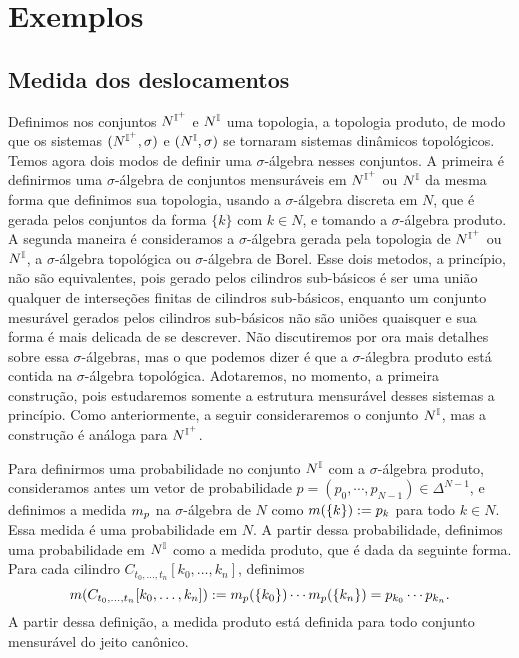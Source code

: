 










\section{Exemplos}

\subsection{Medida dos deslocamentos}

Definimos nos conjuntos $N^{\mathbb{I}^+}$ e $N^{\mathbb{I}}$ uma topologia, a topologia produto, de modo que os sistemas $(N^{\mathbb{I}^+},\sigma)$ e $(N^{\mathbb{I}},\sigma)$ se tornaram sistemas dinâmicos topológicos. Temos agora dois modos de definir uma $\sigma$-álgebra nesses conjuntos. A primeira é definirmos uma $\sigma$-álgebra de conjuntos mensuráveis em $N^{\mathbb{I}^+}$ ou $N^{\mathbb{I}}$ da mesma forma que definimos sua topologia, usando a $\sigma$-álgebra discreta em $N$, que é gerada pelos conjuntos da forma $\{k\}$ com $k \in N$, e tomando a $\sigma$-álgebra produto. A segunda maneira é consideramos a $\sigma$-álgebra gerada pela topologia de $N^{\mathbb{I}^+}$ ou $N^{\mathbb{I}}$, a $\sigma$-álgebra topológica ou $\sigma$-álgebra de Borel. Esse dois metodos, a princípio, não são equivalentes, pois gerado pelos cilindros sub-básicos é ser uma união qualquer de interseções finitas de cilindros sub-básicos, enquanto um conjunto mesurável gerados pelos cilindros sub-básicos não são uniões quaisquer e sua forma é mais delicada de se descrever. Não discutiremos por ora mais detalhes sobre essa $\sigma$-álgebras, mas o que podemos dizer é que a $\sigma$-álegbra produto está contida na $\sigma$-álgebra topológica. Adotaremos, no momento, a primeira construção, pois estudaremos somente a estrutura mensurável desses sistemas a princípio. Como anteriormente, a seguir consideraremos o conjunto $N^{\mathbb{I}}$, mas a construção é análoga para $N^{\mathbb{I}^+}$.

Para definirmos uma probabilidade no conjunto $N^{\mathbb{I}}$ com a $\sigma$-álgebra produto, consideramos antes um vetor de probabilidade $p=(p_0,\cdots,p_{N-1}) \in \Delta^{N-1}$, e definimos a medida $m_p$ na $\sigma$-álgebra de $N$ como $m(\{k\}) := p_k$ para todo $k \in N$. Essa medida é uma probabilidade em $N$. A partir dessa probabilidade, definimos uma probabilidade em $N^{\mathbb{I}}$ como a medida produto, que é dada da seguinte forma. Para cada cilindro $C_{t_0,\ldots,t_n}[k_0,\ldots,k_n]$, definimos
	\begin{equation*}
	m(C_{t_0,\ldots,t_n}[k_0,\ldots,k_n]) := m_p(\{k_0\}) \cdots m_p(\{k_n\}) = p_{k_0} \cdots p_{k_n}.
	\end{equation*}
A partir dessa definição, a medida produto está definida para todo conjunto mensurável do jeito canônico.

